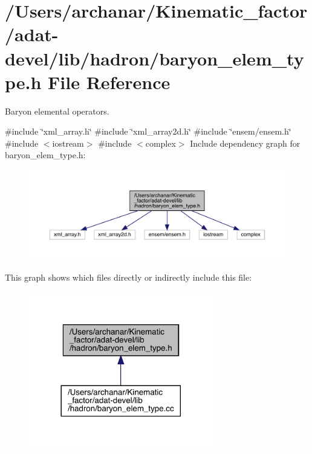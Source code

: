 \hypertarget{adat-devel_2lib_2hadron_2baryon__elem__type_8h}{}\section{/\+Users/archanar/\+Kinematic\+\_\+factor/adat-\/devel/lib/hadron/baryon\+\_\+elem\+\_\+type.h File Reference}
\label{adat-devel_2lib_2hadron_2baryon__elem__type_8h}


Baryon elemental operators.  


{\ttfamily \#include \char`\"{}xml\+\_\+array.\+h\char`\"{}}\newline
{\ttfamily \#include \char`\"{}xml\+\_\+array2d.\+h\char`\"{}}\newline
{\ttfamily \#include \char`\"{}ensem/ensem.\+h\char`\"{}}\newline
{\ttfamily \#include $<$iostream$>$}\newline
{\ttfamily \#include $<$complex$>$}\newline
Include dependency graph for baryon\+\_\+elem\+\_\+type.\+h\+:
\nopagebreak
\begin{figure}[H]
\begin{center}
\leavevmode
\includegraphics[width=350pt]{db/d7d/adat-devel_2lib_2hadron_2baryon__elem__type_8h__incl}
\end{center}
\end{figure}
This graph shows which files directly or indirectly include this file\+:
\nopagebreak
\begin{figure}[H]
\begin{center}
\leavevmode
\includegraphics[width=228pt]{d2/db6/adat-devel_2lib_2hadron_2baryon__elem__type_8h__dep__incl}
\end{center}
\end{figure}
